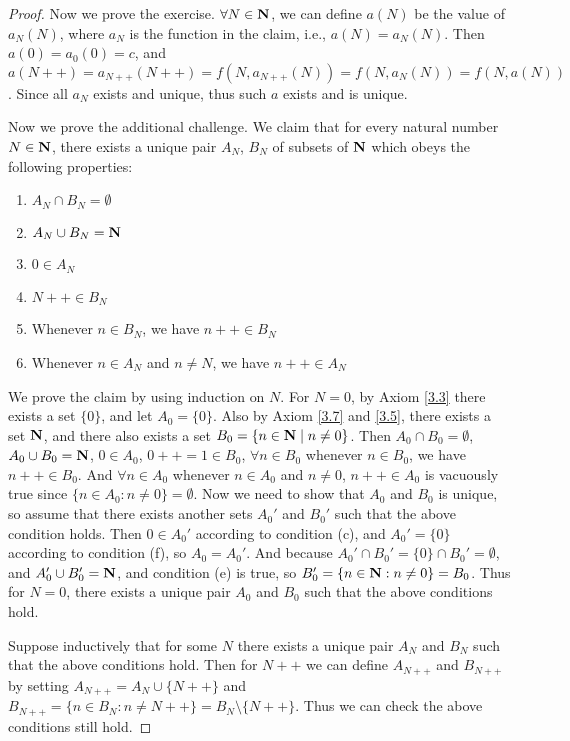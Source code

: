 \begin{proof}
    Now we prove the exercise.
    \(\forall N \in \mathbf{N}\), we can define \(a(N)\) be the value of \(a_N(N)\), where \(a_N\) is the function in the claim, i.e., \(a(N) = a_{N}(N)\).
    Then \(a(0) = a_0(0) = c\), and \(a(N++) = a_{N++}(N++) = f(N, a_{N++}(N)) = f(N, a_{N}(N)) = f(N, a(N))\).
    Since all \(a_N\) exists and unique, thus such \(a\) exists and is unique.

    Now we prove the additional challenge.
    We claim that for every natural number \(N \in \mathbf{N}\), there exists a unique pair \(A_N\), \(B_N\) of subsets of \(\mathbf{N}\) which obeys the following properties:
    \begin{enumerate}
        \item \(A_N \cap B_N = \emptyset\)
        \item \(A_N \cup B_N = \mathbf{N}\)
        \item \(0 \in A_N\)
        \item \(N++ \in B_N\)
        \item Whenever \(n \in B_N\), we have \(n++ \in B_N\)
        \item Whenever \(n \in A_N\) and \(n \neq N\), we have \(n++ \in A_N\)
    \end{enumerate}

    We prove the claim by using induction on \(N\).
    For \(N = 0\), by Axiom \ref{3.3} there exists a set \(\{0\}\), and let \(A_0 = \{0\}\).
    Also by Axiom \ref{3.7} and \ref{3.5}, there exists a set \(\mathbf{N}\), and there also exists a set \(B_0 = \{n \in \mathbf{N} \mid n \neq 0\}\).
    Then \(A_0 \cap B_0 = \emptyset\), \(A_0 \cup B_0 = \mathbf{N}\), \(0 \in A_0\), \(0++ = 1 \in B_0\), \(\forall n \in B_0\) whenever \(n \in B_0\), we have \(n++ \in B_0\).
    And \(\forall n \in A_0\) whenever \(n \in A_0\) and \(n \neq 0\), \(n++ \in A_0\) is vacuously true since \(\{n \in A_0 : n \neq 0\} = \emptyset\).
    Now we need to show that \(A_0\) and \(B_0\) is unique, so assume that there exists another sets \(A_0'\) and \(B_0'\) such that the above condition holds.
    Then \(0 \in A_0'\) according to condition (c), and \(A_0' = \{0\}\) according to condition (f), so \(A_0 = A_0'\).
    And because \(A_0' \cap B_0' = \{0\} \cap B_0' = \emptyset\), and \(A_0' \cup B_0' = \mathbf{N}\), and condition (e) is true, so \(B_0' = \{n \in \mathbf{N} : n \neq 0\} = B_0\).
    Thus for \(N = 0\), there exists a unique pair \(A_0\) and \(B_0\) such that the above conditions hold.

    Suppose inductively that for some \(N\) there exists a unique pair \(A_N\) and \(B_N\) such that the above conditions hold.
    Then for \(N++\) we can define \(A_{N++}\) and \(B_{N++}\) by setting \(A_{N++} = A_N \cup \{N++\}\) and \(B_{N++} = \{n \in B_N : n \neq N++\} = B_N \setminus \{N++\}\).
    Thus we can check the above conditions still hold.


\end{proof}
